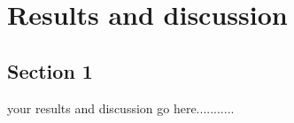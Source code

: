 \chapter{Results and discussion}  %

\section{\large Section 1} %

 

 

your results and discussion go here........... 